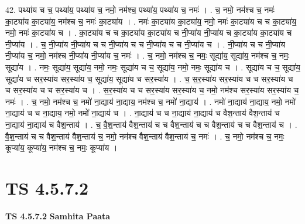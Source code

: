 \documentclass[17pt]{extarticle}
\begin{document}
42. पथ्या॑य च च॒ पथ्या॑य॒ पथ्या॑य च॒ नमो॒ नम॑श्च॒ पथ्या॑य॒ पथ्या॑य च॒ नमः॑ । . च॒ नमो॒ नम॑श्च च॒ नमः॑ का॒ट्या॑य का॒ट्या॑य॒ नम॑श्च च॒ नमः॑ का॒ट्या॑य । . नमः॑ का॒ट्या॑य का॒ट्या॑य॒ नमो॒ नमः॑ का॒ट्या॑य च च का॒ट्या॑य॒ नमो॒ नमः॑ का॒ट्या॑य च । . का॒ट्या॑य च च का॒ट्या॑य का॒ट्या॑य च नी॒प्या॑य नी॒प्या॑य च का॒ट्या॑य का॒ट्या॑य च नी॒प्या॑य । . च॒ नी॒प्या॑य नी॒प्या॑य च च नी॒प्या॑य च च नी॒प्या॑य च च नी॒प्या॑य च । . नी॒प्या॑य च च नी॒प्या॑य नी॒प्या॑य च॒ नमो॒ नम॑श्च नी॒प्या॑य नी॒प्या॑य च॒ नमः॑ । . च॒ नमो॒ नम॑श्च च॒ नमः॒ सूद्या॑य॒ सूद्या॑य॒ नम॑श्च च॒ नमः॒ सूद्या॑य । . नमः॒ सूद्या॑य॒ सूद्या॑य॒ नमो॒ नमः॒ सूद्या॑य च च॒ सूद्या॑य॒ नमो॒ नमः॒ सूद्या॑य च । . सूद्या॑य च च॒ सूद्या॑य॒ सूद्या॑य च सर॒स्या॑य सर॒स्या॑य च॒ सूद्या॑य॒ सूद्या॑य च सर॒स्या॑य । . च॒ स॒र॒स्या॑य सर॒स्या॑य च च सर॒स्या॑य च च सर॒स्या॑य च च सर॒स्या॑य च । . स॒र॒स्या॑य च च सर॒स्या॑य सर॒स्या॑य च॒ नमो॒ नम॑श्च सर॒स्या॑य सर॒स्या॑य च॒ नमः॑ । . च॒ नमो॒ नम॑श्च च॒ नमो॑ ना॒द्याय॑ ना॒द्याय॒ नम॑श्च च॒ नमो॑ ना॒द्याय॑ । . नमो॑ ना॒द्याय॑ ना॒द्याय॒ नमो॒ नमो॑ ना॒द्याय॑ च च ना॒द्याय॒ नमो॒ नमो॑ ना॒द्याय॑ च । . ना॒द्याय॑ च च ना॒द्याय॑ ना॒द्याय॑ च वैश॒न्ताय॑ वैश॒न्ताय॑ च ना॒द्याय॑ ना॒द्याय॑ च वैश॒न्ताय॑ । . च॒ वै॒श॒न्ताय॑ वैश॒न्ताय॑ च च वैश॒न्ताय॑ च च वैश॒न्ताय॑ च च वैश॒न्ताय॑ च । . वै॒श॒न्ताय॑ च च वैश॒न्ताय॑ वैश॒न्ताय॑ च॒ नमो॒ नम॑श्च वैश॒न्ताय॑ वैश॒न्ताय॑ च॒ नमः॑ । . च॒ नमो॒ नम॑श्च च॒ नमः॒ कूप्या॑य॒ कूप्या॑य॒ नम॑श्च च॒ नमः॒ कूप्या॑य । \newline
\pagebreak
{}

\section{ TS 4.5.7.2 }

\textbf{TS 4.5.7.2 } \newline
\textbf{Samhita Paata} \newline
\end{document}
